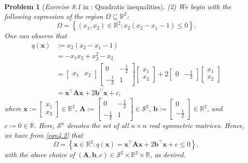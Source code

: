 \documentclass[11pt]{article}
\newtheorem{problem}{Problem}
\numberwithin{equation}{problem}
\begin{document}
\begin{problem} [\emph{Exercise 8.1} in \cite{calafiore2014optimization}: Quadratic inequalities]
{\indent (2) We begin with the following expression of the region $\Omega \subseteq \mathbb{R}^2$:
\begin{equation*}
    \Omega = \left\{ \left( x_1, x_2 \right) \in \mathbb{R}^2 : x_2 \left( x_2 - x_1 - 1 \right) \leq 0 \right\}.
\end{equation*}
One can observe that
\begin{equation}
    \label{eqn4.2}
    \begin{split}
        q (\mathbf{x})
        &:= x_2 \left( x_2 - x_1 - 1 \right) \\
        &= - x_1 x_2 + x_{2}^2 - x_2 \\
        &= \begin{bmatrix} x_1 & x_2 \end{bmatrix}
        \begin{bmatrix}
            0 & - \frac{1}{2} \\ - \frac{1}{2} & 1
        \end{bmatrix}
        \begin{bmatrix} x_1 \\ x_2 \end{bmatrix}
        + 2 \begin{bmatrix} 0 & - \frac{1}{2} \end{bmatrix}
        \begin{bmatrix} x_1 \\ x_2 \end{bmatrix} \\
        &= \mathbf{x}^{\top} \mathbf{A} \mathbf{x} + 2 \mathbf{b}^{\top} \mathbf{x} + c,
    \end{split}
\end{equation}
where $\mathbf{x} := \begin{bmatrix} x_1 \\ x_2 \end{bmatrix} \in \mathbb{R}^2$, $\mathbf{A} := \begin{bmatrix} 0 & - \frac{1}{2} \\ - \frac{1}{2} & 1 \end{bmatrix} \in \mathcal{S}^2$, $\mathbf{b} := \begin{bmatrix} 0 \\ - \frac{1}{2} \end{bmatrix} \in \mathbb{R}^2$, and $c := 0 \in \mathbb{R}$. Here, $\mathcal{S}^n$ denotes the set of all $n \times n$ real symmetric matrices. Hence, we have from \eqref{eqn4.2} that
\begin{equation*}
    \Omega = \left\{ \mathbf{x} \in \mathbb{R}^2 : q (\mathbf{x}) = \mathbf{x}^{\top} \mathbf{A} \mathbf{x} + 2 \mathbf{b}^{\top} \mathbf{x} + c \leq 0 \right\},
\end{equation*}
with the above choice of $\left( \mathbf{A}, \mathbf{b}, c \right) \in \mathcal{S}^2 \times \mathbb{R}^2 \times \mathbb{R}$, as desired.
\medskip

}
\end{problem}
\end{document}
